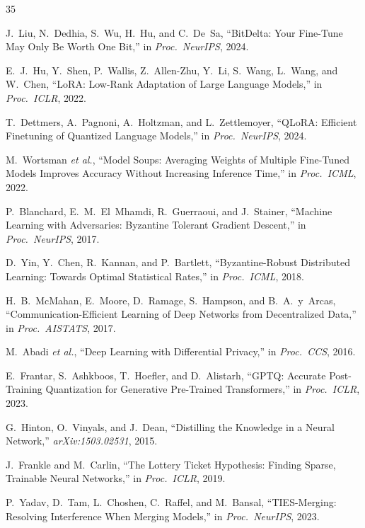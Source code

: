 \documentclass[11pt,letterpaper]{article}
\begin{document}

\begin{thebibliography}{35}

J.~Liu, N.~Dedhia, S.~Wu, H.~Hu, and C.~De~Sa, ``BitDelta: Your Fine-Tune May Only Be Worth One Bit,'' in \emph{Proc.\ NeurIPS}, 2024.

E.~J.~Hu, Y.~Shen, P.~Wallis, Z.~Allen-Zhu, Y.~Li, S.~Wang, L.~Wang, and W.~Chen, ``LoRA: Low-Rank Adaptation of Large Language Models,'' in \emph{Proc.\ ICLR}, 2022.

T.~Dettmers, A.~Pagnoni, A.~Holtzman, and L.~Zettlemoyer, ``QLoRA: Efficient Finetuning of Quantized Language Models,'' in \emph{Proc.\ NeurIPS}, 2024.

M.~Wortsman \emph{et al.}, ``Model Soups: Averaging Weights of Multiple Fine-Tuned Models Improves Accuracy Without Increasing Inference Time,'' in \emph{Proc.\ ICML}, 2022.

P.~Blanchard, E.~M.~El~Mhamdi, R.~Guerraoui, and J.~Stainer, ``Machine Learning with Adversaries: Byzantine Tolerant Gradient Descent,'' in \emph{Proc.\ NeurIPS}, 2017.

D.~Yin, Y.~Chen, R.~Kannan, and P.~Bartlett, ``Byzantine-Robust Distributed Learning: Towards Optimal Statistical Rates,'' in \emph{Proc.\ ICML}, 2018.

H.~B.~McMahan, E.~Moore, D.~Ramage, S.~Hampson, and B.~A.~y~Arcas, ``Communication-Efficient Learning of Deep Networks from Decentralized Data,'' in \emph{Proc.\ AISTATS}, 2017.

M.~Abadi \emph{et al.}, ``Deep Learning with Differential Privacy,'' in \emph{Proc.\ CCS}, 2016.

E.~Frantar, S.~Ashkboos, T.~Hoefler, and D.~Alistarh, ``GPTQ: Accurate Post-Training Quantization for Generative Pre-Trained Transformers,'' in \emph{Proc.\ ICLR}, 2023.

G.~Hinton, O.~Vinyals, and J.~Dean, ``Distilling the Knowledge in a Neural Network,'' \emph{arXiv:1503.02531}, 2015.

J.~Frankle and M.~Carlin, ``The Lottery Ticket Hypothesis: Finding Sparse, Trainable Neural Networks,'' in \emph{Proc.\ ICLR}, 2019.

P.~Yadav, D.~Tam, L.~Choshen, C.~Raffel, and M.~Bansal, ``TIES-Merging: Resolving Interference When Merging Models,'' in \emph{Proc.\ NeurIPS}, 2023.


\end{thebibliography}
\end{document}

